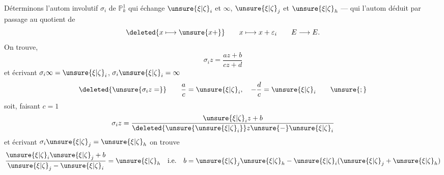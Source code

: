 Déterminons l'autom involutif $\sigma_i$ de $\mathbb P^1_k$ qui échange
$\unsure{\xi|\zeta}_i$ et $\infty$, $\unsure{\xi|\zeta}_j$ et $\unsure{\xi|\zeta}_h$ --- qui 
 l'autom déduit par passage au quotient de
\[
\deleted{x\longmapsto\unsure{x+}}\qquad x\longmapsto x+\varepsilon_i\qquad E\longrightarrow E.
\]
On trouve, 
\[
\sigma_i z=\frac{az+b}{cz+d}
\]
et écrivant $\sigma_i\infty=\unsure{\xi|\zeta}_i$, $\sigma_i\unsure{\xi|\zeta}_i=\infty$
\[
\deleted{\unsure{\sigma_i z=}}\qquad\frac ac=\unsure{\xi|\zeta}_i,\quad-\frac dc=\unsure{\xi|\zeta}_i\qquad\unsure{;} 
\]
soit, faisant $c=1$
\[
\sigma_i z=\frac{\unsure{\xi|\zeta}_i z+b}{\deleted{\unsure{\unsure{\xi|\zeta}_i}}z\unsure{-}\unsure{\xi|\zeta}_i}
\]
et écrivant $\sigma_i\unsure{\xi|\zeta}_j=\unsure{\xi|\zeta}_h$ on trouve
\[
\frac{\unsure{\xi|\zeta}_i\unsure{\xi|\zeta}_j+b}{\unsure{\xi|\zeta}_j-\unsure{\xi|\zeta}_i}=\unsure{\xi|\zeta}_h\quad\text{i.e.}\quad
b=\unsure{\xi|\zeta}_j\unsure{\xi|\zeta}_h-\unsure{\xi|\zeta}_i(\unsure{\xi|\zeta}_j+\unsure{\xi|\zeta}_h)
\]

